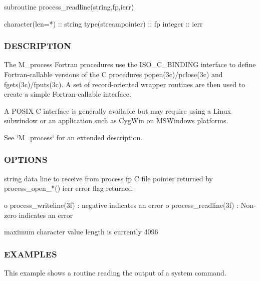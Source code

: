 \begin{DoxyVerb} subroutine process_readline(string,fp,ierr)

   character(len=*)    :: string
   type(streampointer) :: fp
   integer             :: ierr
\end{DoxyVerb}


\subsubsection*{D\+E\+S\+C\+R\+I\+P\+T\+I\+ON}

The M\+\_\+process Fortran procedures use the I\+S\+O\+\_\+\+C\+\_\+\+B\+I\+N\+D\+I\+NG interface to define Fortran-\/callable versions of the C procedures popen(3c)/pclose(3c) and fgets(3c)/fputs(3c). A set of record-\/oriented wrapper routines are then used to create a simple Fortran-\/callable interface.

A P\+O\+S\+IX C interface is generally available but may require using a Linux subwindow or an application such as Cyg\+Win on M\+S\+Windows platforms.

See \char`\"{}\+M\+\_\+process\char`\"{} for an extended description.

\subsubsection*{O\+P\+T\+I\+O\+NS}

\begin{DoxyVerb}string   data line to receive from process
fp       C file pointer returned by process_open_*()
ierr     error flag returned.

          o process_writeline(3f) : negative indicates an error
          o process_readline(3f)  : Non-zero indicates an error

maximum character value length is currently 4096
\end{DoxyVerb}


\subsubsection*{E\+X\+A\+M\+P\+L\+ES}

This example shows a routine reading the output of a system command.

